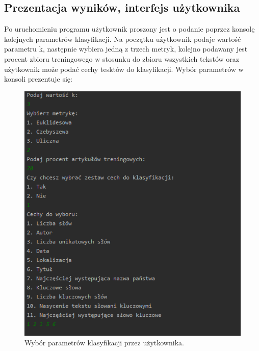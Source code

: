 \documentclass{classrep}
\begin{document}
\newpage


\subsection{Prezentacja wyników, interfejs użytkownika} 

Po uruchomieniu programu użytkownik proszony jest o podanie poprzez konsolę kolejnych parametrów klasyfikacji. Na początku użytkownik podaje wartość parametru k, następnie wybiera jedną z trzech metryk, kolejno podawany jest procent zbioru treningowego w stosunku do zbioru wszystkich tekstów oraz użytkownik może podać cechy tesktów do klasyfikacji. Wybór parametrów w konsoli prezentuje się:

\begin{figure}[h!]
 \centering
 \includegraphics[width=14cm]{Wybor.png}
 \vspace{-0.3cm}
 \caption{Wybór parametrów klasyfikacji przez użytkownika. }
 \label{Wybór parametrów klasyfikacji przez użytkownika. }
\end{figure}
\end{document}
